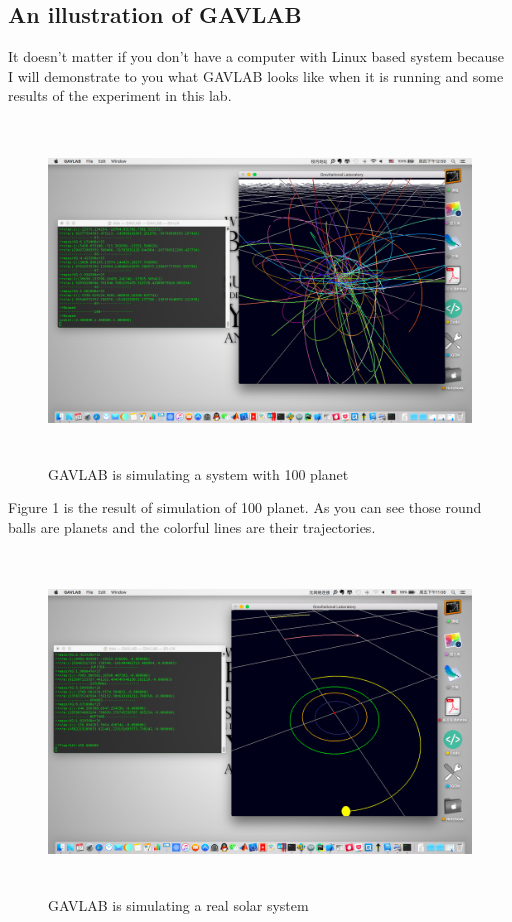 \documentclass[12pt]{article}
\begin{document}
\subsection{An illustration of GAVLAB} %
It doesn't matter if you don't have a computer with Linux based system because I will demonstrate to you
what GAVLAB looks like when it is running and some results of the experiment in this lab.

\begin{figure}[H]
\centering
\includegraphics[width=14.4cm,height=9cm]{100.png}
\caption{GAVLAB is simulating a system with 100 planet}
\end{figure}


Figure 1 is the result of simulation of 100 planet.
As you can see those round balls are planets and the colorful lines are their trajectories.

\begin{figure}[H]
\centering
\includegraphics[width=14.4cm,height=9cm]{Solar.png}
\caption{GAVLAB is simulating a real solar system}
\end{figure}
\end{document}

